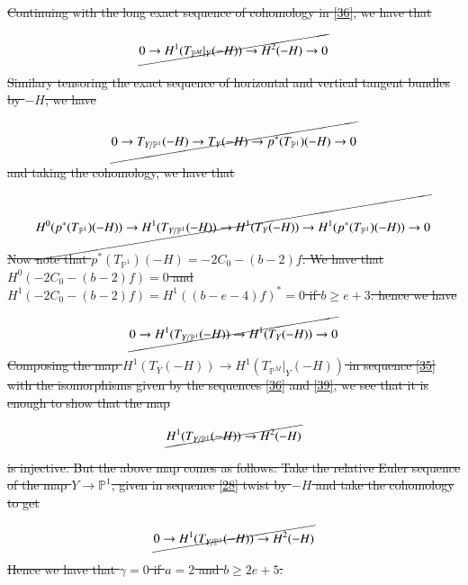 \documentclass[11pt,twoside]{amsart}
\theoremstyle{plain}
\numberwithin{equation}{section}
\theoremstyle{definition}
\begin{document}
\color{black}


\sout{Continuing with the long exact sequence of cohomology in \ref{36}, we have that }

\begin{equation}\label{36}
  \cancel{  0 \to H^1(T_{\mathbb{P}^M}|_Y(-H)) \to H^2(-H) \to 0 }
\end{equation}

\sout{Similary tensoring the exact sequence of horizontal and vertical tangent bundles by $-H$, we have}

\begin{equation}\label{37}
  \cancel{  0 \to T_{Y/\mathbb{P}^1}(-H) \to T_Y(-H) \to p^*(T_{\mathbb{P}^1})(-H) \to 0}
\end{equation}

\sout{and taking the cohomology, we have that }

\begin{equation}\label{38}
  \cancel{  H^0(p^*(T_{\mathbb{P}^1})(-H)) \to H^1(T_{Y/\mathbb{P}^1}(-H)) \to H^1(T_Y(-H)) \to H^1(p^*(T_{\mathbb{P}^1})(-H)) \to 0 }
\end{equation}

\sout{Now note that $p^*(T_{\mathbb{P}^1})(-H) = -2C_0-(b-2)f$. We have that $H^0(-2C_0-(b-2)f) = 0$ and $H^1(-2C_0-(b-2)f) = H^1((b-e-4)f)^* = 0$ if $b \geq e+3$. hence we have }

\begin{equation}\label{39}
  \cancel{  0 \to H^1(T_{Y/\mathbb{P}^1}(-H)) \to H^1(T_Y(-H)) \to  0 }
\end{equation}

\sout{Composing the map $H^1(T_Y(-H)) \to H^1(T_{\mathbb{P}^M}|_Y(-H))$ in sequence \ref{35} with the isomorphisms given by the sequences \ref{36} and \ref{39}, we see that it is enough to show that the map }

\begin{equation}\label{40}
     \cancel{H^1(T_{Y/\mathbb{P}^1}(-H)) \to H^2(-H)}
\end{equation}

\sout{is injective. But the above map comes as follows: Take the relative Euler sequence of the map $Y \to \mathbb{P}^1$, given in sequence \ref{28} twist by $-H$ and take the cohomology to get}

\begin{equation}\label{41}
    \cancel{0 \to H^1(T_{Y/\mathbb{P}^1}(-H)) \to H^2(-H)}
\end{equation}

\sout{Hence we have that $\gamma = 0$ if $a = 2$ and $b \geq 2e+5$.} 
\end{document}
